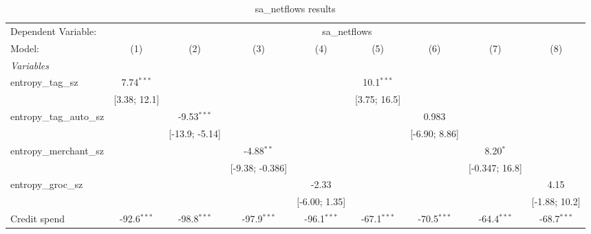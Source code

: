 
\begin{table}[htbp]
   \centering
   \tiny
   \begin{threeparttable}[b]
      \caption{sa\_netflows results}
      \begin{tabular}{lcccccccc}
         \tabularnewline \midrule \midrule
         Dependent Variable: & \multicolumn{8}{c}{sa\_netflows}\\
         Model:                    & (1)             & (2)             & (3)             & (4)             & (5)             & (6)             & (7)             & (8)\\  
         \midrule
         \emph{Variables}\\
         entropy\_tag\_sz          & 7.74$^{***}$    &                 &                 &                 & 10.1$^{***}$    &                 &                 &   \\   
                                   & [3.38; 12.1]    &                 &                 &                 & [3.75; 16.5]    &                 &                 &   \\   
         entropy\_tag\_auto\_sz    &                 & -9.53$^{***}$   &                 &                 &                 & 0.983           &                 &   \\   
                                   &                 & [-13.9; -5.14]  &                 &                 &                 & [-6.90; 8.86]   &                 &   \\   
         entropy\_merchant\_sz     &                 &                 & -4.88$^{**}$    &                 &                 &                 & 8.20$^{*}$      &   \\   
                                   &                 &                 & [-9.38; -0.386] &                 &                 &                 & [-0.347; 16.8]  &   \\   
         entropy\_groc\_sz         &                 &                 &                 & -2.33           &                 &                 &                 & 4.15\\   
                                   &                 &                 &                 & [-6.00; 1.35]   &                 &                 &                 & [-1.88; 10.2]\\   
         Credit spend              & -92.6$^{***}$   & -98.8$^{***}$   & -97.9$^{***}$   & -96.1$^{***}$   & -67.1$^{***}$   & -70.5$^{***}$   & -64.4$^{***}$   & -68.7$^{***}$\\   

\end{tabular}
\end{threeparttable}
\end{table}
